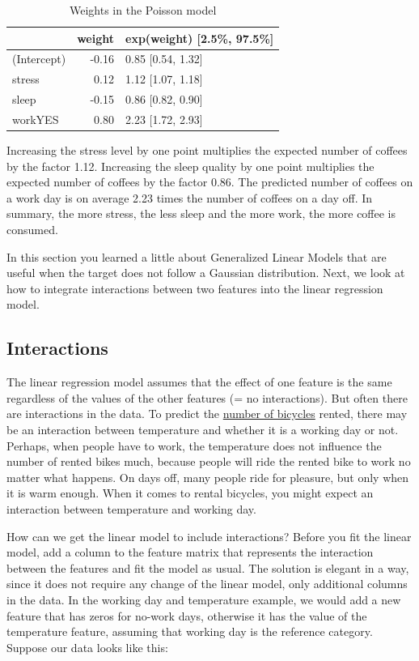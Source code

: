 \documentclass[
  11pt,
]{scrbook}
\begin{document}
\begin{table}

\caption{\label{tab:poisson-model-params}Weights in the Poisson model}
\centering
\begin{tabular}[t]{lrl}
\toprule
  & weight & exp(weight) [2.5\%, 97.5\%]\\
\midrule
(Intercept) & -0.16 & 0.85 [0.54, 1.32]\\
stress & 0.12 & 1.12 [1.07, 1.18]\\
sleep & -0.15 & 0.86 [0.82, 0.90]\\
workYES & 0.80 & 2.23 [1.72, 2.93]\\
\bottomrule
\end{tabular}
\end{table}

Increasing the stress level by one point multiplies the expected number of coffees by the factor 1.12.
Increasing the sleep quality by one point multiplies the expected number of coffees by the factor 0.86.
The predicted number of coffees on a work day is on average 2.23 times the number of coffees on a day off.
In summary, the more stress, the less sleep and the more work, the more coffee is consumed.

In this section you learned a little about Generalized Linear Models that are useful when the target does not follow a Gaussian distribution.
Next, we look at how to integrate interactions between two features into the linear regression model.

\hypertarget{lm-interact}{%
\subsection{Interactions}\label{lm-interact}}

The linear regression model assumes that the effect of one feature is the same regardless of the values of the other features (= no interactions).
But often there are interactions in the data.
To predict the \protect\hyperlink{bike-data}{number of bicycles} rented, there may be an interaction between temperature and whether it is a working day or not.
Perhaps, when people have to work, the temperature does not influence the number of rented bikes much, because people will ride the rented bike to work no matter what happens.
On days off, many people ride for pleasure, but only when it is warm enough.
When it comes to rental bicycles, you might expect an interaction between temperature and working day.

How can we get the linear model to include interactions?
Before you fit the linear model, add a column to the feature matrix that represents the interaction between the features and fit the model as usual.
The solution is elegant in a way, since it does not require any change of the linear model, only additional columns in the data.
In the working day and temperature example, we would add a new feature that has zeros for no-work days, otherwise it has the value of the temperature feature, assuming that working day is the reference category.
Suppose our data looks like this:
\end{document}
